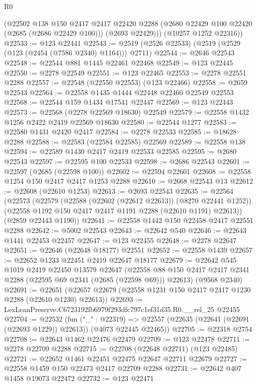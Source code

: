 \begin{lexlean}{R0}
\begin{coremodule}
        (@22502
          @138
          @150
          @2417
          @2417
          @22420
          @2288
          (@2680 @22429 @100 @22420 (@2685 (@2686 @22429 @100)))
          (@2693 @22429)))
      (@10257 @1252 @22316))
@22533 := @123 @22441
@22543 := @2519 (@2526 @22533) (@2519 (@2529 (@123 (@2454 (@7586 @2340) @1164))) @2711)
@22544 := @2646 @22543
@22548 := @22544 @881 @1445 @22461 @22468
@22549 := @123 @22445
@22550 := @2278 @22549
@22551 := @123 @22465
@22553 := @2278 @22551 @2288
@22557 := @22548 (@22550 @22553) (@123 @22466)
@22558 := @2659 @22543
@22564 := @22558 @1435 @1444 @22448 @22460 @22549 @22553
@22568 := @22544 @159 @1434 @17541 @22447
@22569 := @123 @22443
@22573 := @22568 (@2278 @22569 @18630) @22549
@22579 := @22558 @1432 @1256 @2422 @2419 @22569 @18630
@22580 := @22544 @1277
@22583 := @22580 @1431 @2420 @2417
@22584 := @2278 @22533
@22585 := @18628 @2288
@22588 := @22583 (@22584 @22585) @22569
@22589 := @22558 @138
@22594 := @22589 @1430 @2417 @2419 @22533 @22585
@22595 := @2680 @22543
@22597 := @22595 @100 @22533
@22598 := @2686 @22543
@22601 := @22597 (@2685 (@22598 @100))
@22602 := @22594 @22601
@22608 := @22558 @1254 @150 @2417 @2417 @1253 @2288
@22610 := @2668 @22543 @13
@22612 := @22608 (@22610 @1253)
@22613 := @2693 @22543
@22635 := @22564
    (@22573
      (@22579
        (@22588 (@22602 (@22612 @22613)) (@8270 @22441 @1252))
        (@22558 @1192 @150 @2417 @2417 @1191 @2288 (@22610 @1191) @22613))
      (@2859 @22443 @1190))
@22641 := @22558 @1442 @150 @22458 @2417 @22551 @2288
@22642 := @5002 @22543
@22643 := @22642 @540
@22646 := @22643 @1441 @22453 @22457
@22647 := @123 @22455
@22648 := @2278 @22647
@22651 := @22646 (@22648 @18177) @22551
@22652 := @22558 @1439
@22657 := @22652 @1233 @22451 @2419 @22647 @18177
@22679 := @22642
    @545
    @1019
    @2419
    @22450
    @13579
    @22647
    (@22558 @88 @150 @2417 @2417 @2341 @2288 (@22595 @69 @2341 (@2685 (@22598 @69))) @22613)
    (@9568 @2340)
@22691 := @22651 (@22657 @22679 (@22558 @1231 @150 @2417 @2417 @1230 @2288 (@22610 @1230) @22613))
@22693 := LexLeanPreserve.C6723192fb6979f293dfc797c1ef31d35.R0.__rel_25 @22455
@22704 := @22532
    (fun ("_" : @22319) =>
    @22557 (@22635 (@22641 (@22691 (@22693 @1229)) @22613)) (@4073 @22445 @22465))
@22705 := @22318 @2754
@22708 := @22643 @1462 @22476 @22479
@22709 := @123 @22478
@22711 := @2278 @22709 @2288
@22715 := @22708 (@22648 @22711) (@123 @22485)
@22721 := @22652 @1461 @22451 @22475 @22647 @22711 @22679
@22727 := @22558 @1459 @150 @22473 @2417 @22709 @2288
@22731 := @22642 @407 @1458 @19073 @22472
@22732 := @123 @22471

\end{coremodule}
\end{lexlean}

